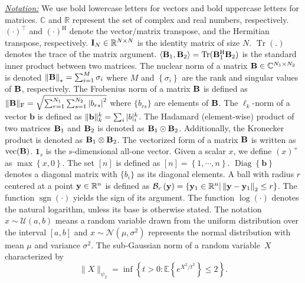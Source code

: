 \documentclass[12pt,draftcls,onecolumn]{IEEEtran}
\begin{document}
\underline{\emph{Notation:}}
We use bold lowercase letters for vectors and bold uppercase letters for matrices. $\mathbb{C}$ and $\mathbb{R}$ represent the set of complex and real numbers, respectively. $(\cdot)^{\top}$ and $(\cdot)^{\mathrm{H}}$ denote the vector/matrix transpose, and the Hermitian transpose, respectively. $\mathbf{I}_{N}\in \mathbb{R}^{N\times N}$ is the identity matrix of size $N$. $\operatorname{Tr}(.)$ denotes the trace of the matrix argument. $\left\langle \mathbf{B}_{1},\mathbf{B}_{2}\right\rangle=\operatorname{Tr}(\mathbf{B}_{1}^{\mathrm{H}}\mathbf{B}_{2})$ is the standard inner product between two
matrices. The nuclear norm of a matrix $\mathbf{B}\in \mathbb{C}^{N_{1}\times N_{2}}$ is denoted $\left\|\mathbf{B}\right\|_{\star}=\sum^{M}_{i=1}\sigma_{i}$ where $M$ and $\left\{\sigma_{i}\right\}$ are the rank and singular values of $\mathbf{B}$, respectively. The Frobenius norm of a matrix $\mathbf{B}$ is defined as $\|\mathbf{B}\|_{\mathrm{F}}=\sqrt{\sum^{N_{1}}_{r=1}\sum^{N_{2}}_{s=1}\left|b_{rs}\right|^{2}}$ where $\{b_{rs}\}$ are elements of $\mathbf{B}$. The $\ell_{k}$-norm of a vector $\mathbf{b}$ is defined as $\|\mathbf{b}\|^{k}_{k}=\sum_{i}|b|^{k}_{i}$. The Hadamard (element-wise) product of two matrices $\mathbf{B}_{1}$ and $\mathbf{B}_{2}$ is denoted as $\mathbf{B}_{1}\odot \mathbf{B}_{2}$. Additionally, the  Kronecker product is denoted as $\mathbf{B}_{1}\otimes\mathbf{B}_{2}$. The vectorized form of a matrix $\mathbf{B}$ is written as $\operatorname{vec}(\mathbf{B})$. $\mathbf{1}_{s}$ is the $s$-dimensional all-one vector. Given a scalar $x$, we define $(x)^{+}$ as $\max\left\{x,0\right\}$. The set $[n]$ is defined as $[n]=\left\{1,\cdots,n\right\}$. $\operatorname{Diag}\left\{\mathbf{b}\right\}$ denotes a diagonal matrix with $\{b_{i}\}$ as its diagonal elements. A ball with radius $r$ centered at a point $\mathbf{y}\in\mathbb{R}^{n}$ is defined as $\mathcal{B}_r\left(\mathbf{y}\right)=\left\{\mathbf{y}_1\in\mathbb{R}^{n}|\left\|\mathbf{y}-\mathbf{y}_1\right\|_2\leq r\right\}$. The function $\operatorname{sgn}(\cdot)$ yields the sign of its argument. The function $\log(\cdot)$ denotes the natural logarithm, unless its base is otherwise stated. The notation $x \sim \mathcal{U}(a,b)$ means a random variable drawn from the uniform distribution over the interval $[a,b]$ and $x \sim \mathcal{N}(\mu,\sigma^2)$ represents the normal distribution with mean $\mu$ and variance $\sigma^2$. The sub-Gaussian norm of a random variable~$X$ characterized by
\begin{equation}
\label{STARIAN}
\|X\|_{\psi_2}=\inf \left\{t>0: \mathbb{E}\left\{e^{X^2/t^2}\right\} \leq 2\right\}.
\end{equation}
\end{document}
